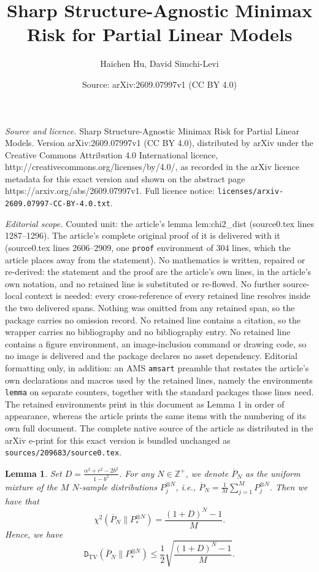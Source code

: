 \documentclass[10pt,a4paper]{amsart}
\title{\normalfont Sharp Structure-Agnostic Minimax Risk for Partial Linear Models}
\author{Haichen Hu, David Simchi-Levi}
\date{Source: arXiv:2609.07997v1 (CC BY 4.0)}
\newtheorem{lemma}{Lemma}
\newcommand{\ZZ}{\mathbb{Z}}
\begin{document}
\maketitle

\noindent\emph{Source and licence.} \normalfont Sharp Structure-Agnostic Minimax Risk for Partial Linear Models. Version arXiv:2609.07997v1 (CC BY 4.0), distributed by arXiv under the Creative Commons Attribution 4.0 International licence, http://creativecommons.org/licenses/by/4.0/, as recorded in the arXiv licence metadata for this exact version and shown on the abstract page https://arxiv.org/abs/2609.07997v1. Full licence notice: \texttt{licenses/arxiv-2609.07997-CC-BY-4.0.txt}.\par\smallskip

\noindent\textit{Editorial scope.} Counted unit: the article's lemma lem:chi2\_dist (source0.tex lines 1287--1296). The article's complete original proof of it is delivered with it (source0.tex lines 2606--2909, one \texttt{proof} environment of 304 lines, which the article places away from the statement). No mathematics is written, repaired or re-derived: the statement and the proof are the article's own lines, in the article's own notation, and no retained line is substituted or re-flowed.  No further source-local context is needed: every cross-reference of every retained line resolves inside the two delivered spans.  Nothing was omitted from any retained span, so the package carries no omission record.  No retained line contains a citation, so the wrapper carries no bibliography and no bibliography entry.  No retained line contains a figure environment, an image-inclusion command or drawing code, so no image is delivered and the package declares no asset dependency.  Editorial formatting only, in addition: an AMS \texttt{amsart} preamble that restates the article's own declarations and macros used by the retained lines, namely the environments \texttt{lemma} on separate counters, together with the standard packages those lines need.  The retained environments print in this document as Lemma 1 in order of appearance, whereas the article prints the same items with the numbering of its own full document.  The complete native source of the article as distributed in the arXiv e-print for this exact version is bundled unchanged as \texttt{sources/209683/source0.tex}.
\begin{lemma}\label{lem:chi2_dist}
    Set $D=\frac{\alpha^2+r^2-2b^2}{1-b^2}$. For any $N\in\ZZ^+$, we denote $\overline{P}_N$ as the uniform mixture of the \(M\) \(N\)-sample distributions \(P_j^{\otimes N}\), i.e., $\overline{P}_N=\frac{1}{M}\sum_{j=1}^MP_j^{\otimes N}$. Then we have that
    \[
    \chi^2(\overline{P}_N\|P_*^{\otimes N})=\frac{(1+D)^N-1}{M}.
    \]
    Hence, we have
    \[
    \texttt{D}_\text{TV}(\overline{P}_N\|P_*^{\otimes N})\le \frac{1}{2}\sqrt{\frac{(1+D)^N-1}{M}}.
    \]
\end{lemma}
\end{document}
